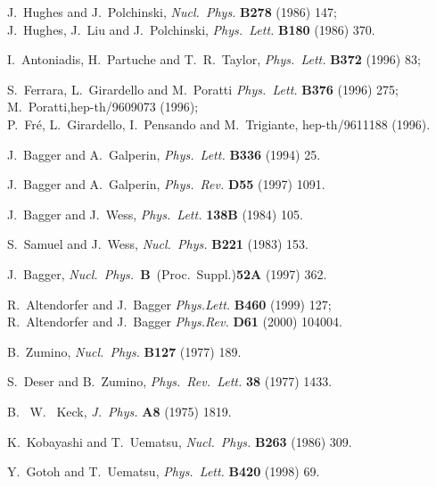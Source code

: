 \documentclass[a4paper,12pt]{article}
\begin{document}

\vspace{1cm}


%
\baselineskip 17pt
\begin{thebibliography}{99}

     J.~Hughes and J.~Polchinski, {\sl Nucl.~Phys.} {\bf B278} (1986) 147;\\
     J.~Hughes, J.~Liu and J.~Polchinski, {\sl Phys.~Lett.} 
     {\bf B180} (1986) 370.

     I.~Antoniadis, H.~Partuche and T.~R.~Taylor, {\sl Phys.~Lett.} 
     {\bf B372} (1996) 83;

     S.~Ferrara, L.~Girardello and M.~Poratti {\sl Phys.~Lett.} {\bf B376} 
     (1996) 275; \\
     M.~Poratti,hep-th/9609073 (1996);\\
     P.~Fr{\'e}, L.~Girardello, I.~Pensando and M.~Trigiante, hep-th/9611188
     (1996).

     J.~Bagger and A.~Galperin, {\sl Phys.~Lett.} {\bf B336} (1994) 25.

     J.~Bagger and A.~Galperin, {\sl Phys.~Rev.} {\bf D55} (1997) 1091.

     J.~Bagger and J.~Wess, {\sl Phys.~Lett.} {\bf 138B} (1984) 105.

     S.~Samuel and J.~Wess, {\sl Nucl.~Phys.} {\bf B221} (1983) 153.

     J.~Bagger, {\sl Nucl.~Phys.}~{\bf B}~(Proc.~Suppl.){\bf 52A} (1997) 362.

     R.~Altendorfer and  J.~Bagger {\sl Phys.Lett.} {\bf B460} (1999) 127;\\
     R.~Altendorfer and  J.~Bagger {\sl Phys.Rev.} {\bf D61} (2000) 104004. 

     B.~Zumino, {\sl Nucl.~Phys.} {\bf B127} (1977) 189.

     S.~Deser and B.~Zumino, {\sl Phys.~Rev.~Lett.} {\bf 38} (1977) 1433.

     B. ~W. ~Keck, {\sl J.~Phys.} {\bf A8} (1975) 1819.

     K.~Kobayashi and T.~Uematsu, {\sl Nucl.~Phys.} {\bf B263} (1986) 309.

     Y.~Gotoh and T.~Uematsu, {\sl Phys.~Lett.} {\bf B420} (1998) 69.


\end{thebibliography}
\end{document}
